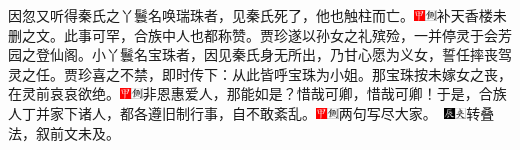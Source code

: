 因忽又听得秦氏之丫鬟名唤瑞珠者，见秦氏死了，他也触柱而亡。{\includegraphics[width=3mm]{../Images/00002}\includegraphics[width=3mm]{../Images/00011}\footnotesize \kaishu 补天香楼未删之文。}此事可罕，合族中人也都称赞。贾珍遂以孙女之礼殡殓，一并停灵于会芳园之登仙阁。小丫鬟名宝珠者，因见秦氏身无所出，乃甘心愿为义女，誓任摔丧驾灵之任。贾珍喜之不禁，即时传下：从此皆呼宝珠为小姐。那宝珠按未嫁女之丧，在灵前哀哀欲绝。{\includegraphics[width=3mm]{../Images/00002}\includegraphics[width=3mm]{../Images/00011}\footnotesize \kaishu 非恩惠爱人，那能如是？惜哉可卿，惜哉可卿！}于是，合族人丁并家下诸人，都各遵旧制行事，自不敢紊乱。{\includegraphics[width=3mm]{../Images/00002}\includegraphics[width=3mm]{../Images/00011}\footnotesize \kaishu 两句写尽大家。　}\includegraphics[width=3mm]{../Images/00009}\includegraphics[width=3mm]{../Images/00012}{\footnotesize \kaishu 转叠法，叙前文未及。}

